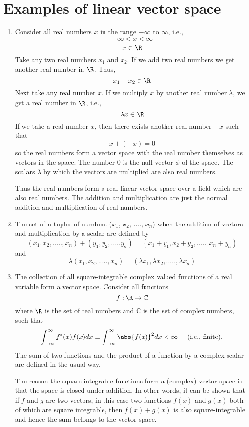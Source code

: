 \section{Examples of linear vector space}

\begin{enumerate}
\item  Consider all real numbers $x$ in the range $-\infty$ to $\infty$, i.e.,
$$-\infty < x < \infty $$
$$x \in  \R$$
Take any two real numbers $x_{1}$ and $x_{2}$. If we add two real numbers we get another real number in $\R$. Thus,
$$x_{1} + x_{2} \in \R$$
Next take any real number $x$. If we multiply $x$ by another real number $\lambda$, we get a real number in $\R$, i.e.,
$$\lambda x \in \R$$
If we take a real number $x$, then there exists another real number $-x$ such that 
$$x + (-x) = 0$$
so the real numbers form a vector space with the real number themselves as vectors in the space. The number 0 is the null vector $\phi$ of the space. The scalars $\lambda$ by which the vectors are multiplied are also real numbers.

Thus the real numbers form a real linear vector space over a field which are also real numbers. The addition and multiplication are just the normal addition and multiplication of real numbers.


\item  The set of n-tuples of numbers ($x_{1}$, $x_{2}$, ...., $x_{n}$) when the addition of vectors and multiplication by a scalar are defined by
$$(x_{1},x_{2},.....,x_{n}) + (y_{1},y_{2},.....y_{n}) = (x_{1}+y_{1},x_{2}+y_{2},.....,x_{n}+y_{n})$$
and
$$\lambda(x_{1},x_{2},.....,x_{n}) = (\lambda x_{1},\lambda x_{2},.....,\lambda x_{n})$$


\item  The collection of all square-integrable complex valued functions of a real variable form a vector space. Consider all functions
$$ f: \R  \rightarrow \mathbb{C}$$
where $\R$ is the set of real numbers and $\mathbb{C}$ is the set of complex numbers, such that
$$\int_{-\infty}^{\infty} f^\ast(x)f(x)dx \equiv \int_{-\infty}^{\infty} \abs{f(x)}^2dx < \infty \hspace{5mm} \text{(i.e., finite).}$$
The sum of two functions and the product of a function by a complex scalar are defined in the usual way.

\hspace{5mm}The reason the square-integrable functions form a (complex) vector space is that the space is closed under addition. In other words, it can be shown that if $f$ and $g$ are two vectors, in this case two functions $f(x)$ and $g(x)$ both of which are square integrable, then $f(x) + g(x)$ is also square-integrable and hence the sum belongs to the vector space.


\end{enumerate}
